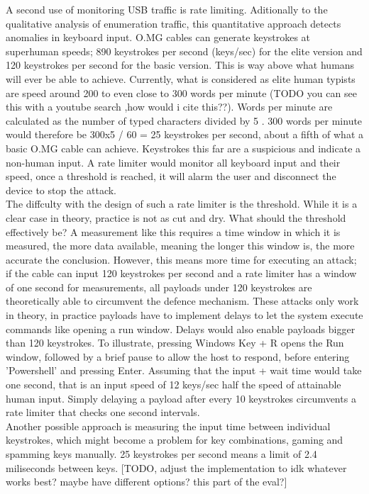 A second use of monitoring USB traffic is rate limiting. Aditionally to the qualitative analysis of enumeration traffic, this quantitative approach detects anomalies in keyboard input. O.MG cables can generate keystrokes at superhuman speeds; 890 keystrokes per second (keys/sec) for the elite version and 120 keystrokes per second for the basic version. This is way above what humans will ever be able to achieve. Currently, what is considered as elite human typists are speed around 200 to even close to 300 words per minute (TODO you can see this with a youtube search ,how would i cite this??). Words per minute are calculated as the number of typed characters divided by 5 \cite{travisWhatWordsMinute2015}. 300 words per minute would therefore be 300x5 / 60 = 25 keystrokes per second, about a fifth of what a basic O.MG cable can achieve.
Keystrokes this far are a suspicious and indicate a non-human input. A rate limiter would monitor all keyboard input and their speed, once a threshold is reached, it will alarm the user and disconnect the device to stop the attack. \\
The diffculty with the design of such a rate limiter is the threshold. While it is a clear case in theory, practice is not as cut and dry. What should the threshold effectively be? A measurement like this requires a time window in which it is measured, the more data available, meaning the longer this window is, the more accurate the conclusion. However, this means more time for executing an attack; if the cable can input 120 keystrokes per second and a rate limiter has a window of one second for measurements, all payloads under 120 keystrokes are theoretically able to circumvent the defence mechanism. These attacks only work in theory, in practice payloads have to implement delays to let the system execute commands like opening a run window. 
Delays would also enable payloads bigger than 120 keystrokes. To illustrate, pressing Windows Key + R opens the Run window, followed by a brief pause to allow the host to respond, before entering 'Powershell' and pressing Enter. Assuming that the input + wait time would take one second, that is an input speed of 12 keys/sec half the speed of attainable human input. Simply delaying a payload after every 10 keystrokes circumvents a rate limiter that checks one second intervals.  \\
Another possible approach is measuring the input time between individual keystrokes, which might become a problem for key combinations, gaming and spamming keys manually. 25 keystrokes per second means a limit of 2.4 miliseconds between keys. [TODO, adjust the implementation to idk whatever works best? maybe have different options? this part of the eval?]

